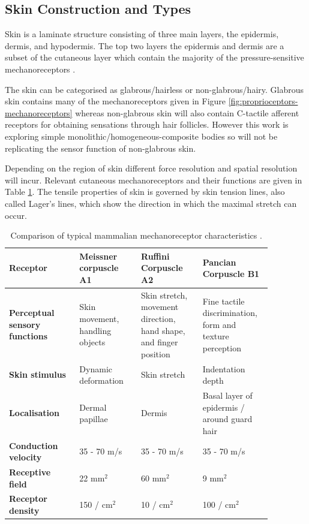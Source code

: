 \subsection{Skin Construction and Types}
Skin is a laminate structure consisting of three main layers, the epidermis, dermis, and hypodermis. The top two layers the epidermis and dermis are a subset of the cutaneous layer which contain the majority of the pressure-sensitive mechanoreceptors \cite{McGrath2010}.

The skin can be categorised as glabrous/hairless or non-glabrous/hairy. Glabrous skin contains many of the mechanoreceptors given in Figure \ref{fig:proprioceptors-mechanoreceptors} whereas non-glabrous skin will also contain C-tactile afferent receptors for obtaining sensations through hair follicles. However this work is exploring simple monolithic/homogeneous-composite bodies so will not be replicating the sensor function of non-glabrous skin.

Depending on the region of skin different force resolution and spatial resolution will incur. Relevant cutaneous mechanoreceptors and their functions are given in Table \ref{tab:mechanoreceptors-table}. The tensile properties of skin is governed by skin tension lines, also called Lager's lines, which show the direction in which the maximal stretch can occur. 

\begin{table}[H]
    \centering
	\caption{Comparison of typical mammalian mechanoreceptor characteristics \cite{Roudaut2012}.}
	\label{tab:mechanoreceptors-table}
	\begin{tabular}{|p{0.24\linewidth}|p{0.21\linewidth}|p{0.21\linewidth}|p{0.21\linewidth}|} \hline
		\textbf{Receptor} & Meissner corpuscle A1 & Ruffini Corpuscle A2 & Pancian Corpuscle B1 \\ \hline
		\textbf{Perceptual   sensory functions} & Skin movement, handling objects & Skin stretch, movement direction,   hand shape, and finger position & Fine tactile discrimination, form   and texture perception \\ \hline
		\textbf{Skin stimulus} & Dynamic deformation & Skin stretch & Indentation depth \\ \hline
		\textbf{Localisation} & Dermal papillae & Dermis & Basal layer of epidermis / around   guard hair \\ \hline
		\textbf{Conduction velocity} & 35 - 70 m/s & 35 - 70 m/s & 35 - 70 m/s  \\ \hline
		\textbf{Receptive field} & 22 mm$^2$ & 60 mm$^2$ & 9 mm$^2$ \\ \hline
		\textbf{Receptor density} & 150 / cm$^2$ & 10 / cm$^2$ & 100 / cm$^2$ \\ \hline
	\end{tabular}
\end{table}


